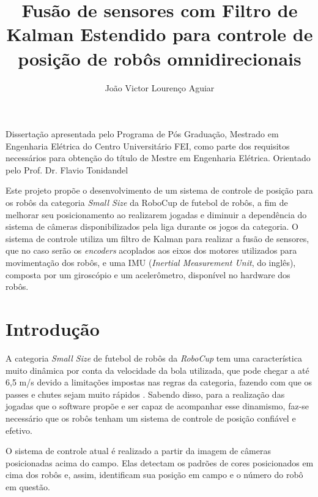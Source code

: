 \documentclass[acronym, symbols]{fei}
\title{Fusão de sensores com Filtro de Kalman Estendido para controle de posição de robôs omnidirecionais}
\author{João Victor Lourenço Aguiar}
\begin{document}
	
\maketitle

\begin{folhaderosto}
	Dissertação apresentada pelo Programa de Pós Graduação, Mestrado em Engenharia Elétrica do Centro Universitário FEI, como parte dos requisitos necessários para obtenção do título de Mestre em Engenharia Elétrica. Orientado pelo Prof. Dr. Flavio Tonidandel
\end{folhaderosto}
	
\begin{resumo}

	Este projeto propõe o desenvolvimento de um sistema de controle de posição para os robôs da categoria \textit{Small Size} da RoboCup de futebol de robôs, a fim de melhorar seu posicionamento ao realizarem jogadas e diminuir a dependência do sistema de câmeras disponibilizados pela liga durante os jogos da categoria. O sistema de controle utiliza um filtro de Kalman para realizar a fusão de sensores, que no caso serão os \textit{encoders} acoplados aos eixos dos motores utilizados para movimentação dos robôs, e uma IMU (\textit{Inertial Measurement Unit}, do inglês), composta por um giroscópio e um acelerômetro, disponível no hardware dos robôs.

\end{resumo}

\listoffigures
\printglossaries
\tableofcontents

\chapter{Introdução}

	A categoria \textit{Small Size} de futebol de robôs da \textit{RoboCup} tem uma característica muito dinâmica por conta da velocidade da bola utilizada, que pode chegar a até 6,5 m/s devido a limitações impostas nas regras da categoria, fazendo com que os passes e chutes sejam muito rápidos \cite{rules}. Sabendo disso, para a realização das jogadas que o software propõe e ser capaz de acompanhar esse dinamismo, faz-se necessário que os robôs tenham um sistema de controle de posição confiável e efetivo.
	
	O sistema de controle atual é realizado a partir da imagem de câmeras posicionadas acima do campo. Elas detectam os padrões de cores posicionados em cima dos robôs e, assim, identificam sua posição em campo e o número do robô em questão. %
	
\end{document}
